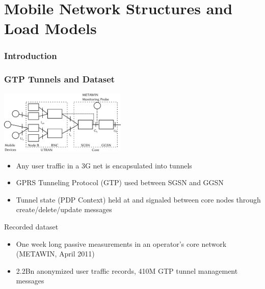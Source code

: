 \documentclass{beamer}
\begin{document}
\section{Mobile Network Structures and Load Models}

\begin{frame}
	\frametitle{Introduction}
\end{frame}
\begin{frame}
    \frametitle{GTP Tunnels and Dataset}

      \begin{center}
		\includegraphics[height=3cm]{../../chapters/04-mobilenets/images/umts-network.pdf}
	\end{center}


    \begin{itemize}
		\item Any user traffic in a 3G net is encapsulated into tunnels
		\item GPRS Tunneling Protocol (GTP) used between SGSN and GGSN
		\item Tunnel state (PDP Context) held at and signaled between core nodes through create/delete/update messages
	\end{itemize}
	Recorded dataset
	\begin{itemize}
		\item One week long passive measurements in an operator's core network (METAWIN, April 2011)
		\item 2.2Bn anonymized user traffic records, 410M GTP tunnel management messages
	\end{itemize}
\end{frame}
\end{document}
